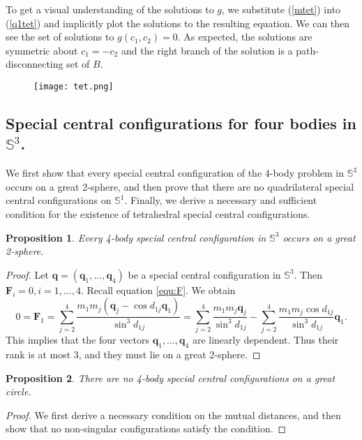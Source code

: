 \documentclass[12pt]{amsart}
\newtheorem{proposition}{Proposition}
\theoremstyle{definition}
\def \mb{\mathbb}
\def \S{\mb S}        %
\newcommand {\q} {\mathbf{q}}
\newcommand {\F} {\mathbf{F}}
\begin{document}
{To get a visual understanding of the solutions to $g$, we substitute (\ref{mtet}) into (\ref{q1tet}) and implicitly plot the solutions to the resulting equation. We can then see the set of solutions to $g(c_1,c_2)=0$. As expected, the solutions are symmetric about $c_1=-c_2$ and the right branch of the solution is a path-disconnecting set of $B$.
\smallskip

\begin{figure}[htbp] 
   \centering
   \texttt{[image: tet.png]}
   \caption{}
   \label{Fig1}
\end{figure}


\smallskip



\subsection{Special central configurations for four bodies in $\S^3$.}
We first show that every special central configuration of the 4-body problem in $\S^3$ occurs on a great 2-sphere, and then prove that there are no quadrilateral special central configurations on $\S^1$. Finally, we derive a necessary and sufficient condition for the existence of tetrahedral special central configurations.
\begin{proposition}
Every 4-body special central configuration in $\S^3$ occurs on a great 2-sphere.
\end{proposition}
\begin{proof}
Let $\q=(\q_1, ..., \q_4)$ be a special central configuration in $\S^3$. 
Then $\F_i=0, i=1,...,4$. Recall equation \eqref{equ:F}. We obtain 
\[ 0=\F_1=\sum_{j=2}^4 \frac{m_1m_j(\q_j-\cos d_{1j}\q_1)}{\sin^3{d_{1j}}}=\sum_{j=2}^4 \frac{m_1m_j\q_j}{\sin^3{d_{1j}}}- \sum_{j=2}^4 \frac{m_1m_j\cos d_{1j}}{\sin^3{d_{1j}}} \q_1.  \] 
This implies that the four vectors $\q_1, ...,\q_4$ are linearly dependent. Thus their rank is at most $3$, and they must lie on a great 2-sphere.
\end{proof}


\begin{proposition}There are no 4-body special central configurations on a great circle.\end{proposition}

\begin{proof}
We first derive a necessary condition on the mutual distances, and then show that no non-singular configurations satisfy the condition.
\smallskip


\end{proof}}
\end{document}
